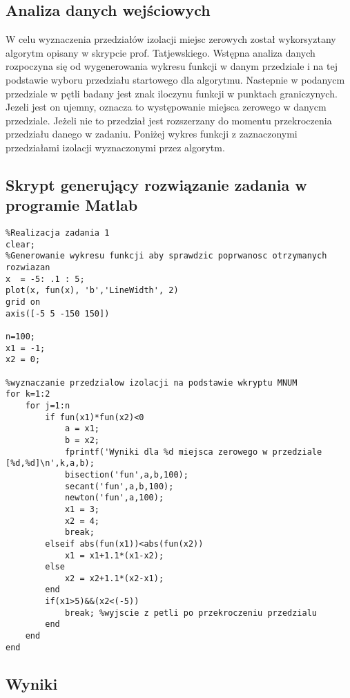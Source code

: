 \documentclass[a4paper, 11pt]{article}
\begin{document}
\subsection{Analiza danych wejściowych}
W celu wyznaczenia przedziałów izolacji miejsc zerowych został wykorsyztany algorytm opisany w skrypcie prof. Tatjewskiego. Wstępna analiza danych rozpoczyna się od wygenerowania wykresu funkcji w danym przedziale i na tej podstawie wyboru przedziału startowego dla algorytmu. Nastepnie w podanycm przedziale w pętli badany jest znak iloczynu funkcji w punktach graniczynych. Jezeli jest on ujemny, oznacza to występowanie miejsca zerowego w danycm przedziale. Jeżeli nie to przedział jest rozszerzany do momentu przekroczenia przedziału danego w zadaniu. 
Poniżej wykres funkcji z zaznaczonymi przedziałami izolacji wyznaczonymi przez algorytm. 


\subsection{Skrypt generujący rozwiązanie zadania w programie Matlab}
\begin{lstlisting}
%Realizacja zadania 1
clear; 
%Generowanie wykresu funkcji aby sprawdzic poprwanosc otrzymanych rozwiazan 
x  = -5: .1 : 5;
plot(x, fun(x), 'b','LineWidth', 2)
grid on
axis([-5 5 -150 150])

n=100; 
x1 = -1; 
x2 = 0; 

%wyznaczanie przedzialow izolacji na podstawie wkryptu MNUM
for k=1:2
    for j=1:n
        if fun(x1)*fun(x2)<0
            a = x1;
            b = x2;
            fprintf('Wyniki dla %d miejsca zerowego w przedziale [%d,%d]\n',k,a,b);
            bisection('fun',a,b,100);
            secant('fun',a,b,100);
            newton('fun',a,100);
            x1 = 3; 
            x2 = 4; 
            break;
        elseif abs(fun(x1))<abs(fun(x2))
            x1 = x1+1.1*(x1-x2);
        else
            x2 = x2+1.1*(x2-x1);
        end
        if(x1>5)&&(x2<(-5))
            break; %wyjscie z petli po przekroczeniu przedzialu
        end
    end
end
\end{lstlisting}
\vspace{1cm}


\subsection{Wyniki}
\end{document}
